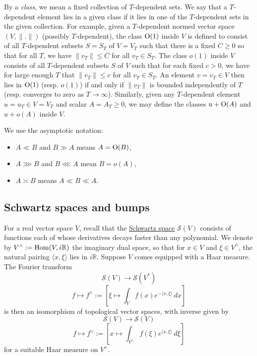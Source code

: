 \documentclass[reqno]{amsart} 
\numberwithin{equation}{section}
\begin{document}
By a \emph{class}, we mean a fixed collection of $T$-dependent sets.  We say that a $T$-dependent element lies in a given class if it lies in one of the $T$-dependent sets in the given collection.  For example, given a $T$-dependent normed vector space $(V, \lVert . \rVert)$ (possibly $T$-dependent), the class $\operatorname{O}(1)$ inside $V$ is defined to consist of all $T$-dependent subsets $S = S_T$ of $V = V_T$ such that there is a fixed $C \geq 0$ so that for all $T$, we have $\lVert v_T \rVert \leq C$ for all $v_T \in S_T$.  The class $o(1)$ inside $V$ consists of all $T$-dependent subsets $S$ of $V$ such that for each fixed $c > 0$, we have for large enough $T$ that $\lVert v_T \rVert \leq c$ for all $v_T \in S_T$.  An element $v = v_T \in V$ then lies in $\operatorname{O}(1)$ (resp. $o(1)$) if and only if $\lVert v_T \rVert$ is bounded independently of $T$ (resp. converges to zero as $T \rightarrow \infty$).  Similarly, given any $T$-dependent element $u = u_T \in V = V_T$ and scalar $A = A_T \geq 0$, we may define the classes $u + \operatorname{O}(A)$ and $u + o(A)$ inside $V$.

We use the asymptotic notation:
\begin{itemize}
\item $A \ll B$ and $B \gg A$ means $A = \operatorname{O}(B)$, 
\item $A \ggg B$ and $B \lll A$ mean $B = o(A)$, 
\item $A \asymp B$ means $A \ll B \ll A$.
\end{itemize}

\subsection{Schwartz spaces and bumps}\label{sec:d1a8de614869}
For a real vector space $V$, recall that the \href{https://en.wikipedia.org/wiki/Schwartz_space}{Schwartz space} $\mathcal{S}(V)$ consists of functions each of whose derivatives decays faster than any polynomial.  We denote by $V^\wedge := \operatorname{Hom}(V, i \mathbb{R})$ the imaginary dual space, so that for $x \in V$ and $\xi \in V^\wedge$, the natural pairing $\langle x, \xi  \rangle$ lies in $i \mathbb{R}$.  Suppose $V$ comes equipped with a Haar measure.  The Fourier transform
\begin{equation*}
\mathcal{S}(V) \rightarrow \mathcal{S}(V^*)
\end{equation*}
\begin{equation*}
f \mapsto f^\wedge := \left[ \xi \mapsto \int_{V} f(x) e^{- \langle x, \xi  \rangle} \, d x \right]
\end{equation*}
is then an isomorphism of topological vector spaces, with inverse given by
\begin{equation*}
\mathcal{S}(V) \rightarrow \mathcal{S}(V)
\end{equation*}
\begin{equation}\label{eqn:d1a913db4ab4}
f \mapsto f^\vee := \left[ x \mapsto \int_{V^\wedge} f(\xi) e^{\langle x, \xi  \rangle} \, d \xi  \right]
\end{equation}
for a suitable Haar measure on $V^\wedge $.
\end{document}
